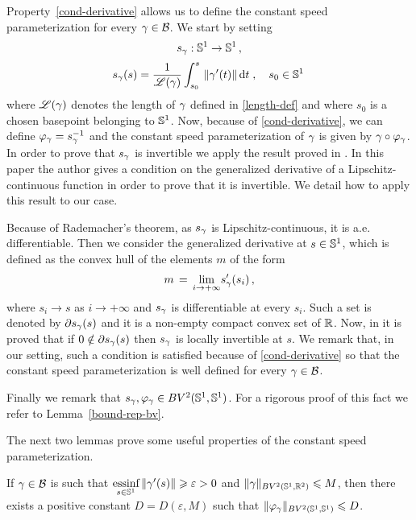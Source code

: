 \begin{rem}\label{arc-len} Property~\eqref{cond-derivative}  allows us to define the constant speed parameterization for every $\gamma\in \mathcal{B}$. We start by setting
$$s_\gamma : \mathbb{S}^1 \rightarrow \mathbb{S}^1\,,$$
$$s_\gamma(s) =\frac{1}{\mathscr{L}(\gamma)} \int_{s_0}^s \,\|\gamma'(t)\| \, \mathrm{d} t \;,\quad s_0\in \mathbb{S}^1\,$$
where $\mathscr{L}(\gamma)$ denotes the length of $\gamma$ defined in \eqref{length-def} and where $s_0$ is a chosen basepoint belonging to $\mathbb{S}^1$. 
Now, because of \eqref{cond-derivative}, we can define $\varphi_\gamma =s_\gamma^{-1}$ and  the constant speed parameterization of $\gamma$ is given by $\gamma\circ \varphi_\gamma$. 
In order to prove that $s_{\gamma}$ is invertible we apply the result proved in \cite{Clarke}. In this paper the author gives a condition on the generalized derivative of a Lipschitz-continuous function in order to prove that it is invertible. We detail how to apply this result to our case.

Because of Rademacher's theorem, as $s_{\gamma}$ is Lipschitz-continuous, it is a.e. differentiable. Then we consider  the generalized derivative at $s\in \mathbb{S}^1$, which is defined as the convex hull of the elements $m$ of the form
$$m\,=\, \underset{i\rightarrow +\infty}{\lim} s_{\gamma}'(s_i)\,,$$
where $s_i\rightarrow s$ as $i\rightarrow +\infty$ and  $s_{\gamma}$ is differentiable at every $s_i$.
Such a set is denoted by $\partial s_{\gamma}(s)$ and it is a non-empty compact convex set of ${\mathbb R}$. Now, in \cite{Clarke} it is proved that if $0\notin \partial s_{\gamma}(s)$ then $s_{\gamma}$ is locally invertible at $s$. We remark that, in our setting, such a condition is satisfied because of \eqref{cond-derivative} so that the constant speed parameterization is well defined for every $\gamma\in \mathcal{B}$.

Finally we remark that $s_{\gamma}, \varphi_\gamma\in BV^2(\mathbb{S}^1, \mathbb{S}^1)$. For a rigorous proof of this fact we refer to Lemma~\ref{bound-rep-bv}.
\end{rem}


The next two lemmas prove some useful properties of the constant speed parameterization.

\begin{lem}\label{bound-rep-bv}
If $\gamma \in \mathcal{B}$ is such that $\underset{s\in \mathbb{S}^1}{\mbox{essinf}}\,\| \gamma'(s) \| \geqslant \varepsilon >0$ and $\| \gamma \|_{BV^2(\mathbb{S}^1,{\mathbb R}^2)} \leqslant M$, then  there exists a positive constant $D = D(\varepsilon,M)$ such that 
$ \| \varphi_\gamma \|_{BV^2(\mathbb{S}^1,\mathbb{S}^1)} \leqslant D$. 
\end{lem}

